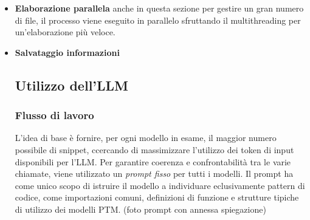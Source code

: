 \documentclass{article}
\begin{document}
\begin{itemize}
    \item \textbf{Elaborazione parallela} anche in questa sezione per gestire un gran numero di file, il processo viene eseguito in parallelo sfruttando il multithreading per un'elaborazione più veloce.

    \item \textbf{Salvataggio informazioni}




\subsection{Utilizzo dell'LLM}

\subsubsection{Flusso di lavoro}
L'idea di base è fornire, per ogni modello in esame, il maggior numero possibile di snippet, ccercando di massimizzare l’utilizzo dei token di input disponibili per l’LLM. Per garantire coerenza e confrontabilità tra le varie chiamate, viene utilizzato un \textit{prompt fisso} per tutti i modelli. Il prompt ha come unico scopo di istruire il modello a individuare eclusivamente pattern di codice, come importazioni comuni, definizioni di funzione e strutture tipiche di utilizzo dei modelli PTM.
(foto prompt con annessa spiegazione)


\end{itemize}
\end{document}
